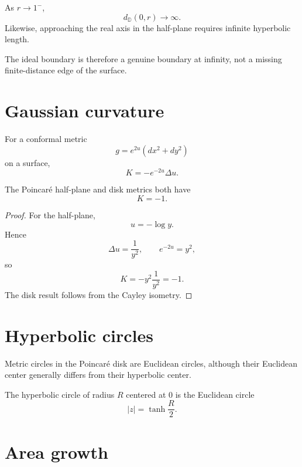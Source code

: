 \begin{proposition}\label{prop:vii32-boundary-infinite}
As \(r\to1^{-}\),
\[
d_{\mathbb D}(0,r)\to\infty.
\]
Likewise, approaching the real axis in the half-plane requires infinite
hyperbolic length.
\end{proposition}

\begin{remark}
The ideal boundary is therefore a genuine boundary at infinity, not a missing
finite-distance edge of the surface.
\end{remark}

\section{Gaussian curvature}

For a conformal metric
\[
g=e^{2u}(dx^2+dy^2)
\]
on a surface,
\[
K=-e^{-2u}\Delta u.
\]

\begin{theorem}\label{thm:vii32-curvature}
The Poincaré half-plane and disk metrics both have
\[
K=-1.
\]
\end{theorem}

\begin{proof}
For the half-plane,
\[
u=-\log y.
\]
Hence
\[
\Delta u=\frac1{y^2},
\qquad
e^{-2u}=y^2,
\]
so
\[
K=-y^2\frac1{y^2}=-1.
\]
The disk result follows from the Cayley isometry.
\end{proof}

\section{Hyperbolic circles}

\begin{proposition}\label{prop:vii32-circles}
Metric circles in the Poincaré disk are Euclidean circles, although their
Euclidean center generally differs from their hyperbolic center.
\end{proposition}

\begin{example}\label{ex:vii32-origin-circle}
The hyperbolic circle of radius \(R\) centered at \(0\) is the Euclidean circle
\[
|z|=\tanh\frac R2.
\]
\end{example}

\section{Area growth}

